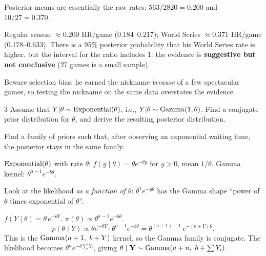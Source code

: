 \documentclass[11pt]{article}
\begin{document}
\begin{sanity}
Posterior means are essentially the raw rates: $563/2820=0.200$ and $10/27=0.370$. \checkmark
\end{sanity}

\begin{answer}
Regular season $\approx0.200$ HR/game (0.184--0.217); World Series $\approx0.371$ HR/game (0.178--0.633). There is a 95\% posterior probability that his World Series rate is higher, but the interval for the ratio includes 1: the evidence is \textbf{suggestive but not conclusive} (27 games is a small sample).
\end{answer}

\begin{takeaway}
Beware selection bias: he earned the nickname \emph{because} of a few spectacular games, so testing the nickname on the same data overstates the evidence.
\end{takeaway}


\begin{problem}{3}
Assume that $Y|\theta\sim\mathrm{Exponential}(\theta)$, i.e., $Y|\theta\sim\mathrm{Gamma}(1,\theta)$. Find a conjugate prior distribution for $\theta$, and derive the resulting posterior distribution.
\end{problem}

\begin{restate}
Find a family of priors such that, after observing an exponential waiting time, the posterior stays in the same family.
\end{restate}

\begin{recall}
$\mathrm{Exponential}(\theta)$ with rate $\theta$: $f(y\mid\theta)=\theta e^{-\theta y}$ for $y>0$, mean $1/\theta$. Gamma kernel: $\theta^{a-1}e^{-b\theta}$.
\end{recall}

\begin{keyidea}
Look at the likelihood \emph{as a function of $\theta$}: $\theta^1e^{-y\theta}$ has the Gamma shape ``power of $\theta$ times exponential of $\theta$''.
\end{keyidea}

\solution
{} $f(Y\mid\theta)=\theta\,e^{-\theta Y}$.
 $\pi(\theta)\propto\theta^{a-1}e^{-b\theta}$.
\[
p(\theta\mid Y)\propto\theta e^{-\theta Y}\cdot\theta^{a-1}e^{-b\theta}=\theta^{(a+1)-1}\,e^{-(b+Y)\theta}.
\]
This is the $\mathrm{Gamma}(a+1,\ b+Y)$ kernel, so the Gamma family is conjugate.
 The likelihood becomes $\theta^ne^{-\theta\sum Y_i}$, giving $\theta\mid\mathbf Y\sim\mathrm{Gamma}(a+n,\ b+\sum Y_i)$.
\end{document}
